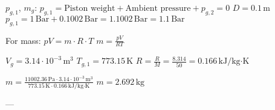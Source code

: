 \( p_{g,1} \), \( m_g \):  
\( p_{g,1} = \text{Piston weight} + \text{Ambient pressure} + p_{g,2} = 0 \)  
\( D = 0.1 \, \text{m} \)  
\( p_{g,1} = 1 \, \text{Bar} + 0.1002 \, \text{Bar} = 1.1002 \, \text{Bar} = 1.1 \, \text{Bar} \)  

For mass:  
\( pV = m \cdot R \cdot T \)  
\( m = \frac{pV}{RT} \)  

\( V_g = 3.14 \cdot 10^{-3} \, \text{m}^3 \)  
\( T_{g,1} = 773.15 \, \text{K} \)  
\( R = \frac{R}{M} = \frac{8.314}{50} = 0.166 \, \text{kJ/kg·K} \)  

\( m = \frac{11002.36 \, \text{Pa} \cdot 3.14 \cdot 10^{-3} \, \text{m}^3}{773.15 \, \text{K} \cdot 0.166 \, \text{kJ/kg·K}} \)  
\( m = 2.692 \, \text{kg} \)  

---